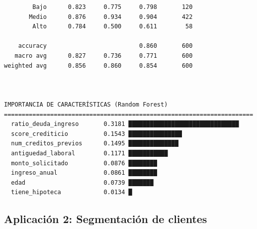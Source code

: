 \documentclass[
  doc,
  floatsintext,
  longtable,
  a4paper,
  nolmodern,
  notxfonts,
  notimes,
  12pt,
  colorlinks=true,linkcolor=blue,citecolor=blue,urlcolor=blue]{apa7}
\begin{document}
\begin{verbatim}
        Bajo      0.823     0.775     0.798       120
       Medio      0.876     0.934     0.904       422
        Alto      0.784     0.500     0.611        58

    accuracy                          0.860       600
   macro avg      0.827     0.736     0.771       600
weighted avg      0.856     0.860     0.854       600



IMPORTANCIA DE CARACTERÍSTICAS (Random Forest)
======================================================================
  ratio_deuda_ingreso       0.3181 ███████████████████████████████
  score_crediticio          0.1543 ███████████████
  num_creditos_previos      0.1495 ██████████████
  antiguedad_laboral        0.1171 ███████████
  monto_solicitado          0.0876 ████████
  ingreso_anual             0.0861 ████████
  edad                      0.0739 ███████
  tiene_hipoteca            0.0134 █
\end{verbatim}

\subsection{Aplicación 2: Segmentación de
clientes}\label{aplicaciuxf3n-2-segmentaciuxf3n-de-clientes}
\end{document}
